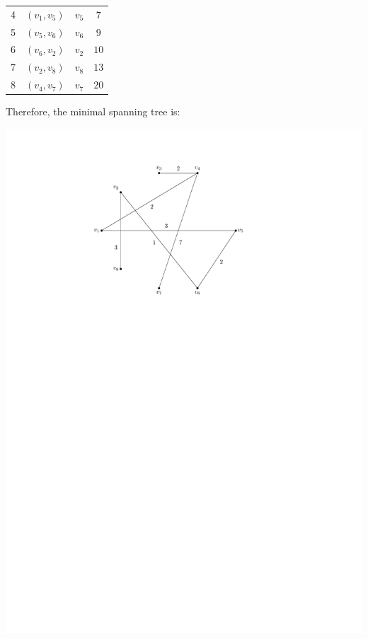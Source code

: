 \begin{Example}
\begin{center}
\begin{tabular}{c|>{\centering\arraybackslash}p{}|>{\centering\arraybackslash}p{}|c}
4 & $(v_1, v_5)$ & $v_5$ & $7$ \\
5 & $(v_5, v_6)$ & $v_6$ & $9$ \\
6 & $(v_6, v_2)$ & $v_2$ & $10$ \\
7 & $(v_2, v_8)$ & $v_8$ & $13$ \\
8 & $(v_4, v_7)$ & $v_7$ & $20$ \\
\end{tabular}
\end{center}
\vspace{1em}
Therefore, the minimal spanning tree is:
\begin{center}
\includegraphics[scale=0.8]{Images/MST.pdf}
\end{center}
\end{Example}

%
